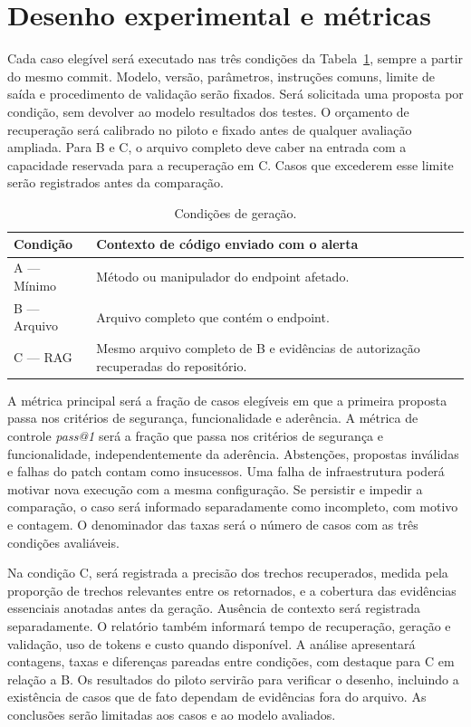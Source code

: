 \section{Desenho experimental e métricas}

Cada caso elegível será executado nas três condições da Tabela~\ref{tab:condicoes}, sempre a partir do mesmo commit. Modelo, versão, parâmetros, instruções comuns, limite de saída e procedimento de validação serão fixados. Será solicitada uma proposta por condição, sem devolver ao modelo resultados dos testes. O orçamento de recuperação será calibrado no piloto e fixado antes de qualquer avaliação ampliada. Para B e C, o arquivo completo deve caber na entrada com a capacidade reservada para a recuperação em C. Casos que excederem esse limite serão registrados antes da comparação.

\begin{table}[H]
\centering
\caption{Condições de geração.}
\label{tab:condicoes}
\small
\begin{tabular}{@{}p{4.1cm}p{10.2cm}@{}}
\toprule
\textbf{Condição} & \textbf{Contexto de código enviado com o alerta} \\
\midrule
A --- Mínimo & Método ou manipulador do endpoint afetado. \\
B --- Arquivo & Arquivo completo que contém o endpoint. \\
C --- RAG & Mesmo arquivo completo de B e evidências de autorização recuperadas do repositório. \\
\bottomrule
\end{tabular}
\par{}
\end{table}

A métrica principal será a fração de casos elegíveis em que a primeira proposta passa nos critérios de segurança, funcionalidade e aderência. A métrica de controle \textit{pass@1} será a fração que passa nos critérios de segurança e funcionalidade, independentemente da aderência. Abstenções, propostas inválidas e falhas do patch contam como insucessos. Uma falha de infraestrutura poderá motivar nova execução com a mesma configuração. Se persistir e impedir a comparação, o caso será informado separadamente como incompleto, com motivo e contagem. O denominador das taxas será o número de casos com as três condições avaliáveis.

Na condição C, será registrada a precisão dos trechos recuperados, medida pela proporção de trechos relevantes entre os retornados, e a cobertura das evidências essenciais anotadas antes da geração. Ausência de contexto será registrada separadamente. O relatório também informará tempo de recuperação, geração e validação, uso de tokens e custo quando disponível. A análise apresentará contagens, taxas e diferenças pareadas entre condições, com destaque para C em relação a B. Os resultados do piloto servirão para verificar o desenho, incluindo a existência de casos que de fato dependam de evidências fora do arquivo. As conclusões serão limitadas aos casos e ao modelo avaliados.
